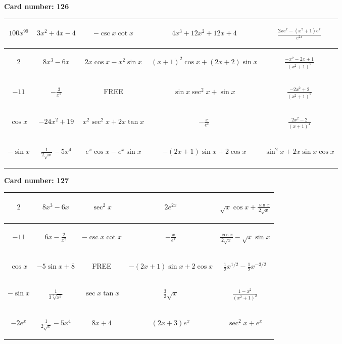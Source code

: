 \documentclass{article}
\newcommand{\entry}[1]{\begin{minipage}[t][2.75cm][t]{4cm} \vspace{1cm} \begin{center}#1\end{center} \end{minipage}}
\newcommand{\freespace}{\entry{FREE}}
\newcommand{\cardnumber}[1]{\noindent \textbf{Card number: #1} \bigskip}
\begin{document}
\pagebreak

\cardnumber{126}
\begin{center}
\begin{tabular}{|*{5}{c|}}
    \hline
    \entry{$100x^{99}$} & \entry{$3x^2 + 4x - 4$} & \entry{$-\csc x \cot x$} & \entry{$4x^3 + 12x^2 + 12x + 4$} & \entry{$\frac{2x e^x - (x^2 + 1) e^x}{e^{2x}}$} \\ \hline
    \entry{$2$} & \entry{$8x^3 - 6x$} & \entry{$2x \cos x - x^2 \sin x$} & \entry{$(x + 1)^2 \cos x + (2x + 2) \sin x$} & \entry{$\frac{-x^2 - 2x + 1}{(x^2 + 1)^2}$} \\ \hline
    \entry{$-11$} & \entry{$-\frac{3}{x^2}$} & \freespace & \entry{$\sin x \sec^2 x + \sin x$} & \entry{$\frac{-2x^2 + 2}{(x^2 + 1)^2}$} \\ \hline
    \entry{$\cos x$} & \entry{$-24x^2 + 19$} & \entry{$x^2 \sec^2 x + 2x \tan x$} & \entry{$-\frac{x}{e^x}$} & \entry{$\frac{2x^2 - 2}{(x + 1)^4}$} \\ \hline
    \entry{$-\sin x$} & \entry{$\frac{1}{2\sqrt{x}} - 5x^4$} & \entry{$e^x \cos x - e^x \sin x$} & \entry{$-(2x + 1) \sin x + 2 \cos x$} & \entry{$\sin^2 x + 2x \sin x \cos x$} \\ \hline
\end{tabular}
\end{center}

\pagebreak

\cardnumber{127}
\begin{center}
\begin{tabular}{|*{5}{c|}}
    \hline
    \entry{$2$} & \entry{$8x^3 - 6x$} & \entry{$\sec^2 x$} & \entry{$2e^{2x}$} & \entry{$\sqrt{x} \cos x + \frac{\sin x}{2 \sqrt{x}}$} \\ \hline
    \entry{$-11$} & \entry{$6x - \frac{2}{x^2}$} & \entry{$-\csc x \cot x$} & \entry{$-\frac{x}{e^x}$} & \entry{$\frac{\cos x}{2 \sqrt{x}} - \sqrt{x} \sin x$} \\ \hline
    \entry{$\cos x$} & \entry{$-5 \sin x + 8$} & \freespace & \entry{$-(2x + 1) \sin x + 2 \cos x$} & \entry{$\frac{1}{2} x^{1/2} - \frac{1}{2} x^{-3/2}$} \\ \hline
    \entry{$-\sin x$} & \entry{$\frac{1}{3\sqrt[3]{x^2}}$} & \entry{$\sec x \tan x$} & \entry{$\frac{3}{2} \sqrt{x}$} & \entry{$\frac{1 - x^2}{(x^2 + 1)^2}$} \\ \hline
    \entry{$-2e^x$} & \entry{$\frac{1}{2\sqrt{x}} - 5x^4$} & \entry{$8x + 4$} & \entry{$(2x + 3) e^x$} & \entry{$\sec^2 x + e^x$} \\ \hline
\end{tabular}
\end{center}
\end{document}
